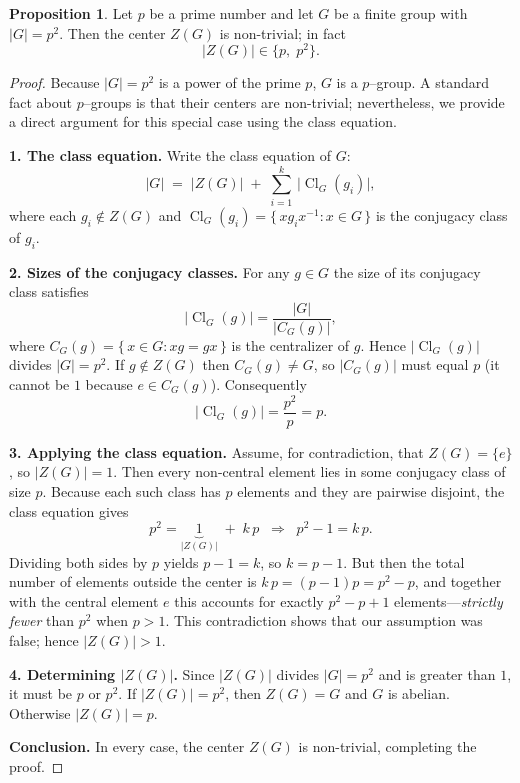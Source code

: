 \documentclass[12pt]{article}
\title{}
\author{Jerich Lee}
\date{\today}
\DeclareMathOperator{\Cl}{Cl}
\theoremstyle{definition} %
\newtheorem{proposition}{Proposition}
\theoremstyle{plain} %
\begin{document}
\maketitle
\begin{proposition}
  Let \(p\) be a prime number and let \(G\) be a finite group with
  \(\lvert G\rvert = p^{2}\).
  Then the center \(Z(G)\) is non-trivial; in fact 
  \[
     \lvert Z(G)\rvert \in \{p,\;p^{2}\}.
  \]
  \end{proposition}
  
  \begin{proof}
  Because \(\lvert G\rvert = p^{2}\) is a power of the prime \(p\),
  \(G\) is a \(p\)--group.
  A standard fact about \(p\)--groups is that their centers are non-trivial; nevertheless, we provide a direct argument for this special case using the class equation.
  
  \medskip
  \noindent\textbf{1.  The class equation.}
  Write the class equation of \(G\):
  \[
     \lvert G\rvert
        \;=\;
        \lvert Z(G)\rvert
        \;+\;
        \sum_{i=1}^{k}\,
        \lvert\Cl_{G}(g_{i})\rvert,
  \]
  where each \(g_{i}\notin Z(G)\) and
  \(\Cl_{G}(g_{i})=\{\,xg_{i}x^{-1}:x\in G\,\}\) is the conjugacy
  class of \(g_{i}\).
  
  \medskip
  \noindent\textbf{2.  Sizes of the conjugacy classes.}
  For any \(g\in G\) the size of its conjugacy class satisfies
  \[
     \lvert\Cl_{G}(g)\rvert
        = \frac{\lvert G\rvert}{\lvert C_{G}(g)\rvert},
  \]
  where \(C_{G}(g)=\{\,x\in G : xg=gx\,\}\) is the centralizer of \(g\).
  Hence \(\lvert\Cl_{G}(g)\rvert\) divides \(\lvert G\rvert=p^{2}\).
  If \(g\notin Z(G)\) then \(C_{G}(g)\neq G\), so
  \(\lvert C_{G}(g)\rvert\) must equal \(p\) (it cannot be \(1\) because
  \(e\in C_{G}(g)\)).
  Consequently
  \[
     \lvert\Cl_{G}(g)\rvert
        =\frac{p^{2}}{p}=p .
  \]
  
  \medskip
  \noindent\textbf{3.  Applying the class equation.}
  Assume, for contradiction, that \(Z(G)=\{e\}\),
  so \(\lvert Z(G)\rvert=1\).
  Then every non-central element lies in some conjugacy class of size \(p\).
  Because each such class has \(p\) elements and they are pairwise
  disjoint, the class equation gives
  \[
     p^{2}=\underbrace{1}_{\lvert Z(G)\rvert}
            \;+\;
            k\,p
     \;\;\Longrightarrow\;\;
     p^{2}-1 = k\,p .
  \]
  Dividing both sides by \(p\) yields
  \(p-1 = k\), so \(k=p-1\).
  But then the total number of elements outside the center is
  \(k\,p = (p-1)p = p^{2}-p\),
  and together with the central element \(e\) this accounts for exactly
  \(p^{2}-p+1\) elements—\emph{strictly fewer} than \(p^{2}\) when
  \(p>1\).
  This contradiction shows that our assumption was false; hence
  \(\lvert Z(G)\rvert>1\).
  
  \medskip
  \noindent\textbf{4.  Determining \(\lvert Z(G)\rvert\).}
  Since \(\lvert Z(G)\rvert\) divides \(\lvert G\rvert=p^{2}\) and is
  greater than \(1\), it must be \(p\) or \(p^{2}\).
  If \(\lvert Z(G)\rvert=p^{2}\), then \(Z(G)=G\) and \(G\) is abelian.
  Otherwise \(\lvert Z(G)\rvert=p\).
  
  \medskip
  \noindent\textbf{Conclusion.}
  In every case, the center \(Z(G)\) is non-trivial, completing the
  proof.
  \end{proof}
\end{document}
